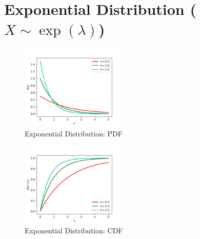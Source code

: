 \chapter{Exponential Distribution ($X \sim \exp(\lambda)$) \cite{ism-1,wiki/Exponential_distribution}} \label{Exponential Distribution}

\begin{table}[H]
    \begin{minipage}{0.49\linewidth}
        \begin{figure}[H]
            \centering
            \includegraphics[width=\linewidth, height=4cm, keepaspectratio]{Pictures/distributions/Exponential_distribution_pdf.jpg}
            \caption{Exponential Distribution: PDF}
        \end{figure}
    \end{minipage}
    \hfill
    \begin{minipage}{0.49\linewidth}
        \begin{figure}[H]
            \centering
            \includegraphics[width=\linewidth, height=4cm, keepaspectratio]{Pictures/distributions/Exponential_distribution_cdf.jpg}
            \caption{Exponential Distribution: CDF}
        \end{figure}
    \end{minipage}
\end{table}

